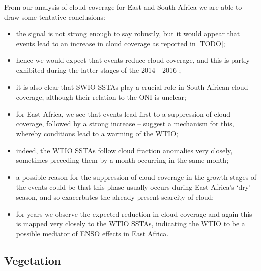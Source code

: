 From our analysis of cloud coverage for East and South Africa we are
able to draw some tentative conclusions:
\begin{itemize}
  \item{the signal is not strong enough to say robustly, but it would
    appear that \nina{} events lead to an increase in cloud coverage
    as reported in \ref{TODO};}
  \item{hence we would expect that \elnino{} events reduce cloud
    coverage, and this is partly exhibited during the latter stages of the
    2014---2016 \elnino{};}
  \item{it is also clear that SWIO SSTAs play a crucial role in South
    African cloud coverage, although their relation to the ONI is
    unclear;}
  \item{for East Africa, we see that \elnino{} events lead first to a
    suppression of cloud coverage, followed by a strong increase --
    \cite{parhi2016} suggest a mechanism for this, whereby \elnino{}
    conditions lead to a warming of the WTIO;}
  \item{indeed, the WTIO SSTAs follow cloud fraction anomalies very
    closely, sometimes preceding them by a month occurring in the same
    month;}
  \item{a possible reason for the suppression of cloud coverage in the
    growth stages of the \elnino{} events could be that this phase
    usually occurs during East Africa's `dry' season, and so
    exacerbates the already present scarcity of cloud;}
  \item{for \nina{} years we observe the expected reduction in cloud
    coverage and again this is mapped very closely to the WTIO SSTAs,
    indicating the WTIO to be a possible mediator of ENSO effects in
    East Africa.}
\end{itemize}
\subsection{Vegetation} 
